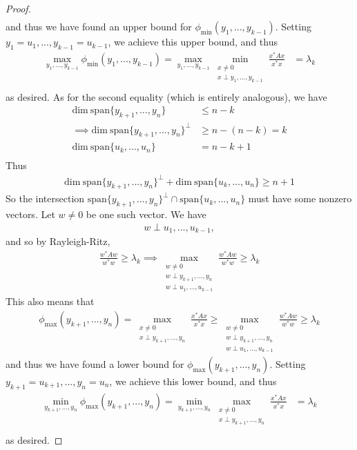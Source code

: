 \documentclass[11pt]{article}
\theoremstyle{plain}
\theoremstyle{definition}
\theoremstyle{remark}
\begin{document}
\begin{proof}
\begin{align*}
    \end{align*}
    and thus we have found an upper bound for $\phi_{\min}(y_1, ..., y_{k-1})$. Setting $y_1 = u_1, ..., y_{k-1} = u_{k-1}$, we achieve this upper bound, and thus
    \begin{align*}
        \max_{y_1 ,..., y_{k-1}} \phi_{\min}(y_1, ..., y_{k-1}) = \max_{y_1 ,..., y_{k-1}} \min_{\substack{x \neq 0 \\ x \perp y_1 ,..., y_{k-1}}} \frac{x^* A x}{x^* x} &= \lambda_k\\
    \end{align*}
    as desired. As for the second equality (which is entirely analogous), we have
    \begin{align*}
        \text{dim} \ \text{span}\{y_{k+1}, ..., y_n\} &\leq n - k\\
        \implies \text{dim} \ \text{span}\{y_{k+1}, ..., y_n\}^{\perp} &\geq n - (n - k) = k\\
        \text{dim} \ \text{span}\{u_k, ..., u_n\} &= n - k + 1\\
    \end{align*}
    Thus
    \begin{align*}
        \text{dim} \ \text{span}\{y_{k+1}, ..., y_n\}^{\perp} + \text{dim} \ \text{span}\{u_k, ..., u_n\} \geq n + 1
    \end{align*}
    So the intersection $\text{span}\{y_{k+1}, ..., y_n\}^{\perp} \cap \text{span}\{u_k, ..., u_n\}$ must have some nonzero vectors. Let $w \neq 0$ be one such vector. We have
    \begin{align*}
        w \perp u_1, ..., u_{k-1},
    \end{align*}
    and so by Rayleigh-Ritz,
    \begin{align*}
        \frac{w^* A w}{w^* w} \geq \lambda_k \implies \max_{\substack{w \neq 0 \\ w \perp y_{k+1} ,..., y_n \\ w \perp u_1, ..., u_{k-1}}} \frac{w^* A w}{w^* w} \geq \lambda_k
    \end{align*}
    This also means that
    \begin{align*}
        \phi_{\max}(y_{k+1}, ..., y_n) = \max_{\substack{x \neq 0 \\ x \perp y_{k+1}, ..., y_n}} \frac{x^* A x}{x^* x} \geq \max_{\substack{w \neq 0 \\ w \perp y_{k+1}, ..., y_n \\ w \perp u_1, ..., u_{k-1}}} \frac{w^* A w}{w^* w} \geq \lambda_k
    \end{align*}
    and thus we have found a lower bound for $\phi_{\max}(y_{k+1}, ..., y_n)$. Setting $y_{k+1} = u_{k+1}, ..., y_n = u_n$, we achieve this lower bound, and thus
    \begin{align*}
        \min_{y_{k+1},..., y_n} \phi_{\max}(y_{k+1}, ..., y_n) = \min_{y_{k+1},..., y_n} \max_{\substack{x \neq 0 \\ x \perp y_{k+1}, ..., y_n}} \frac{x^* A x}{x^* x} &= \lambda_k\\
    \end{align*}
    as desired.
\end{proof}
\end{document}
